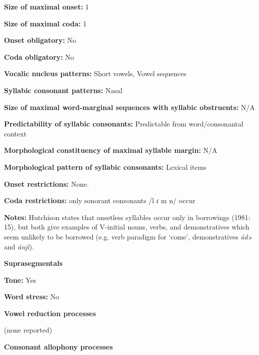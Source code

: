 \textbf{Size of maximal onset:} 1



\textbf{Size of maximal coda:} 1



\textbf{Onset obligatory:} No



\textbf{Coda obligatory:} No



\textbf{Vocalic nucleus patterns:} Short vowels, Vowel sequences



\textbf{Syllabic consonant patterns:} Nasal



\textbf{Size of maximal word{}-marginal sequences with syllabic obstruents:} N/A



\textbf{Predictability of syllabic consonants:} Predictable from word/consonantal context



\textbf{Morphological constituency of maximal syllable margin:} N/A



\textbf{Morphological pattern of syllabic consonants:} Lexical items



\textbf{Onset restrictions:} None.



\textbf{Coda restrictions:} only sonorant consonants /l ɾ m n/ occur \citep[15]{Hutchison1981}



\textbf{Notes:} Hutchison states that onsetless syllables occur only in borrowings (1981: 15), but both \citet{HutchisonCyffer1998} give examples of V-initial nouns, verbs, and demonstratives which seem unlikely to be borrowed (e.g. verb paradigm for ‘come’, demonstratives \textit{ádə} and \textit{ánjì}).



\textbf{Suprasegmentals}



\textbf{Tone:} Yes



\textbf{Word stress:} No



\textbf{Vowel reduction processes}



(none reported)



\textbf{Consonant allophony processes}



